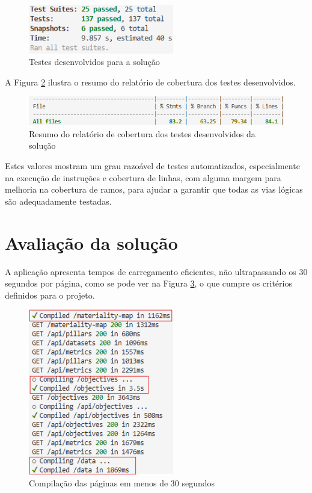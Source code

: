 \begin{figure}[H]
    \centering
    \includegraphics[width=2.5in,keepaspectratio]{frontmatter/assets/tests/test_suits.png}
    \caption{Testes desenvolvidos para a solução}
    \label{fig:test_number}
\end{figure}

A Figura \ref{fig:coverage} ilustra o resumo do relatório de cobertura dos testes desenvolvidos. 

\begin{figure}[H]
    \centering
    \includegraphics[width=\linewidth,keepaspectratio]{frontmatter/assets/tests/coverage.png}
    \caption{Resumo do relatório de cobertura dos testes desenvolvidos da solução}
    \label{fig:coverage}
\end{figure}

Estes valores mostram um grau razoável de testes automatizados, especialmente na execução de instruções e cobertura de linhas, com alguma margem para melhoria na cobertura de ramos, para ajudar a garantir que todas as vias lógicas são adequadamente testadas.

\section{Avaliação da solução} 

A aplicação apresenta tempos de carregamento eficientes, não ultrapassando os 30 segundos por página, como se pode ver na Figura \ref{fig:page_compiling}, o que cumpre os critérios definidos para o projeto.

\begin{figure}[H]
    \centering
    \includegraphics[width=2.5in,keepaspectratio]{frontmatter/assets/compiling/pages_time.png}
    \caption{Compilação das páginas em menos de 30 segundos}
    \label{fig:page_compiling}
\end{figure}

